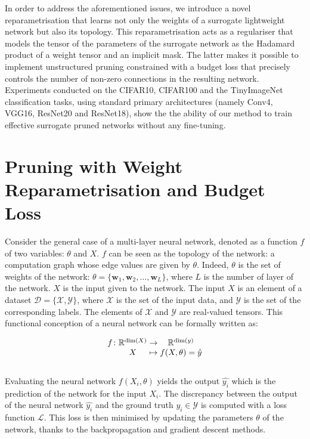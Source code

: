 In order to address the aforementioned issues, we introduce a novel
reparametrisation that learns not only the weights of a surrogate lightweight
network but also its topology. This reparametrisation acts as a regulariser that
models the tensor of the parameters of the surrogate network as the Hadamard
product of a weight tensor and an implicit mask. The latter makes it possible to
implement unstructured pruning constrained with a budget loss that precisely
controls the number of non-zero connections in the resulting network.
Experiments conducted on the CIFAR10, CIFAR100 and the TinyImageNet
classification tasks, using standard primary architectures (namely Conv4, VGG16,
ResNet20 and ResNet18), show the the ability of our method to train effective
surrogate pruned networks without any fine-tuning.


\section{Pruning with Weight Reparametrisation and Budget Loss}
Consider the general case of a multi-layer neural network, denoted as a function
$f$ of two variables: $\theta$ and $X$. $f$ can be seen as the topology of the
network: a computation graph whose edge values are given by $\theta$. Indeed,
$\theta$ is the set of weights of the network: $\theta = \{\mathbf{w}_1,
\mathbf{w}_2, \ldots, \mathbf{w}_L\}$, where $L$ is the number of layer of the
network. $X$ is the input given to the network. The input $X$ is an element of a
dataset $\mathcal{D}=\{ \mathcal{X}, \mathcal{Y} \}$, where $\mathcal{X}$ is the
set of the input data, and $\mathcal{Y}$ is the set of the corresponding labels.
The elements of $\mathcal{X}$ and $\mathcal{Y}$ are real-valued tensors. This
functional conception of a neural network can be formally written as:

\begin{equation}
    \begingroup
  \setlength\arraycolsep{0pt}
  f \colon\begin{array}[t]{c >{{}}c<{{}} c}
             \mathbb{R}^{\dim (X)} & \to & \mathbb{R}^{\dim (y)} \\ 
             X & \mapsto & f(X, \theta) = \hat{y} 
          \end{array}
  \endgroup
\end{equation}\\

Evaluating the neural network $f(X_i, \theta)$ yields the output $\hat{y_i}$
which is the prediction of the network for the input $X_i$. The discrepancy
between the output of the neural network $\hat{y_i}$ and the ground truth $y_i
\in \mathcal{Y}$ is computed with a loss function $\mathcal{L}$. This loss is
then minimised by updating the parameters $\theta$ of the network, thanks to the
backpropagation \cite{rumelhart1985learning,rumelhart1986learning} and gradient
descent methods.\\

